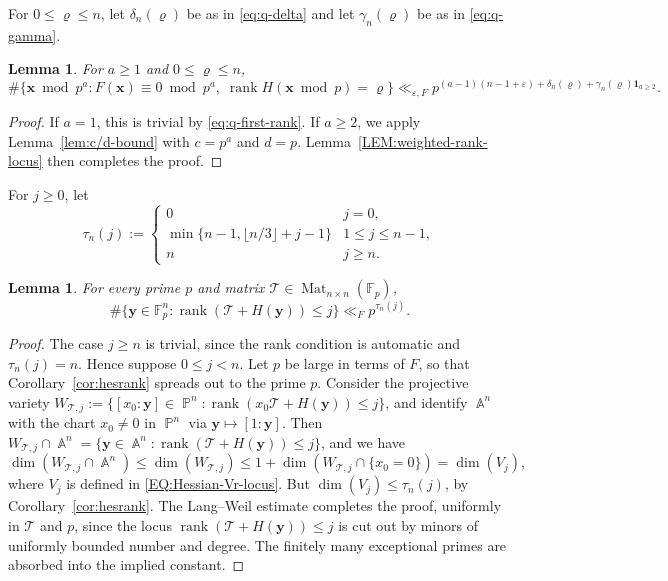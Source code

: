 \documentclass[a4paper,11pt, twoside,reqno]{amsart}
\theoremstyle{plain}
\newtheorem{lemma}[thm]{Lemma}
\theoremstyle{definition}
\theoremstyle{remark}
\newcommand{\bfx}{\bm{x}}
\newcommand{\bfy}{\bm{y}}
\DeclareMathOperator{\rank}{rank}
\DeclareMathOperator{\A}{\mathbb{A}}
\DeclareMathOperator{\PP}{\mathbb{P}}
\DeclareMathOperator{\Mat}{Mat}
\newcommand{\ve}{\varepsilon}
\renewcommand{\le}{\leqslant}
\renewcommand{\leq}{\leqslant}
\renewcommand{\ge}{\geqslant}
\renewcommand{\geq}{\geqslant}
\newcommand{\FF}{\mathbb{F}}
\numberwithin{equation}{section}
\begin{document}
For \(0\leq\varrho\leq n\), let $\delta_n(\varrho)$ be as in \eqref{eq:q-delta}
and let $\gamma_n(\varrho)$ be as in \eqref{eq:q-gamma}.

\begin{lemma}
\label{lem:q-easy-hessian-lift-bound}
For $a\ge 1$ and \(0\leq \varrho\leq n\),
\[
\#\{\bfx\bmod p^a:
F(\bfx)\equiv0\bmod{p^a},\;
\rank H(\bm x\bmod p)=\varrho\}
\ll_{\varepsilon,F}
p^{(a-1)(n-1+\ve)+\delta_n(\varrho)+\gamma_n(\varrho)\bm{1}_{a\ge 2}}.
\]
\end{lemma}

\begin{proof}
If $a=1$, this is trivial by \eqref{eq:q-first-rank}.
If $a\ge 2$, we apply Lemma~\ref{lem:c/d-bound} with \(c=p^a\) and \(d=p\).
Lemma~\ref{LEM:weighted-rank-locus} then completes the proof.
\end{proof}

For $j\ge 0$, let
\begin{equation}
\tau_n(j) :=
\begin{cases}
0&j=0,\\
\min\{n-1,\lfloor n/3\rfloor+j-1\}&1\leq j\leq n-1,\\
n&j\geq n.
\end{cases}
\label{eq:q-tau}
\end{equation}

\begin{lemma}
\label{q-translated-rank}
For every prime \(p\)
and matrix \(\mathcal T\in\Mat_{n\times n}(\FF_p)\),
\begin{equation*}
\#\{\bfy\in\FF_p^n:
\rank(\mathcal T+H(\bfy))\leq j\}
\ll_F p^{\tau_n(j)}.
\end{equation*}
\end{lemma}

\begin{proof}
The case $j\ge n$ is trivial, since the rank condition is
automatic and $\tau_n(j)=n$. Hence suppose $0\le j<n$.
Let $p$ be large in terms of $F$,
so that Corollary~\ref{cor:hesrank} spreads out to the prime $p$.
Consider the projective variety
$W_{\mathcal T,j}
:= \{[x_0:\bfy]\in\PP^n:
\rank(x_0\mathcal T+H(\bfy))\leq j\}$,
and 
identify $\A^n$ with the chart $x_0\ne0$ in $\PP^n$
via $\bfy\mapsto[1:\bfy]$. Then
$W_{\mathcal T,j}\cap\A^n
=\{\bfy\in\A^n:\rank(\mathcal T+H(\bfy))\leq j\}$, and we 
have  $$\dim(W_{\mathcal T,j} \cap \A^n)
\le \dim(W_{\mathcal T,j})
\le 1+\dim(W_{\mathcal T,j} \cap \{x_0=0\})
= \dim(V_j),$$
where $V_j$ is defined 
in \eqref{EQ:Hessian-Vr-locus}.
But $\dim(V_j) \le \tau_n(j)$, by Corollary~\ref{cor:hesrank}.
The Lang--Weil estimate completes the proof, uniformly in $\mathcal T$ and $p$,
since the locus $\rank(\mathcal T+H(\bfy))\leq j$ is cut out by
minors of uniformly bounded number and degree.
The finitely many exceptional primes are absorbed into the implied constant.
\end{proof}
\end{document}
